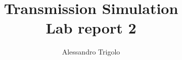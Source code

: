 \documentclass{article}
\title{\vspace{160px} \textbf{\huge{Transmission Simulation}} \\\vspace{17.5px} \LARGE{Lab report 2}  \vspace{10px}}
\author{Alessandro Trigolo}
\begin{document}
\maketitle \newpage

\blinddocument
\end{document}
